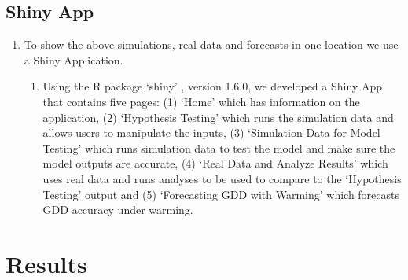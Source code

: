 \documentclass{article}\usepackage[]{graphicx}\usepackage[]{color}
\begin{document}
\subsection*{Shiny App}
\begin{enumerate}
\item To show the above simulations, real data and forecasts in one location we use a Shiny Application. 
  \begin{enumerate}
  \item Using the R package `shiny' \citep{shiny2021}, version 1.6.0, we developed a Shiny App that contains five pages: (1) `Home' which has information on the application, (2) `Hypothesis Testing' which runs the simulation data and allows users to manipulate the inputs, (3) `Simulation Data for Model Testing' which runs simulation data to test the model and make sure the model outputs are accurate, (4) `Real Data and Analyze Results' which uses real data and runs analyses to be used to compare to the `Hypothesis Testing' output and (5) `Forecasting GDD with Warming' which forecasts GDD accuracy under warming. 
  \end{enumerate}
\end{enumerate}

\section*{Results}
\end{document}
